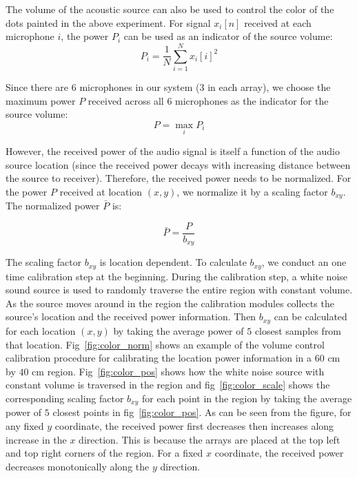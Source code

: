 The volume of the acoustic source can also be used to control the color of the dots painted in the above experiment. For signal $x_i[n]$ received at each microphone $i$, the power $P_i$ can be used as an indicator of the source volume:
\[
P_i = \frac{1}{N} \sum_{i=1}^N x_i[i]^2
\]

Since there are $6$ microphones in our system ($3$ in each array), we choose the maximum power $P$ received across all $6$ microphones as the indicator for the source volume:
\[
P = \max_i P_i 
\]

However, the received power of the audio signal is itself a function of the audio source location (since the received power decays with increasing distance between the source to receiver). Therefore, the received power needs to be normalized. For the power $P$ received at location $(x,y)$, we normalize it by a scaling factor $b_{xy}$. The normalized power $\bar{P}$ is:

\[
\bar{P} = \frac{P}{b_{xy}}
\]

The scaling factor $b_{xy}$ is location dependent. To calculate $b_{xy}$, we conduct an one time calibration step at the beginning. During the calibration step, a white noise sound source is used to randomly traverse the entire region with constant volume. As the source moves around in the region the calibration modules collects the source's location and the received power information. Then $b_{xy}$ can be calculated for each location $(x,y)$  by taking the average power of $5$ closest samples from that location. Fig~\ref{fig:color_norm} shows an example of the volume control calibration procedure for calibrating the location power information in a $60$ cm by $40$ cm region. Fig~\ref{fig:color_pos} shows how the white noise source with constant volume is traversed in the region and fig~\ref{fig:color_scale} shows the corresponding scaling factor $b_{xy}$ for each point in the region by taking the average power of $5$ closest points in fig~\ref{fig:color_pos}. As can be seen from the figure, for any fixed $y$ coordinate, the received power first decreases then increases along increase in the $x$ direction. This is because the arrays are placed at the top left and top right corners of the region. For a fixed $x$ coordinate, the received power decreases monotonically along the $y$ direction.

